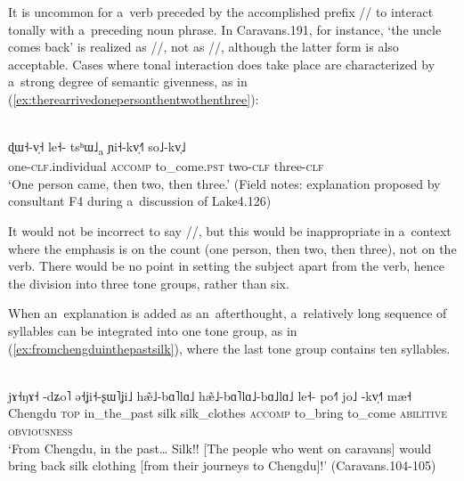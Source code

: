 It is uncommon for a~verb preceded by the {accomplished} prefix // to interact tonally with
a~preceding noun phrase. In Caravans.191, for instance, ‘the uncle comes back’ is realized as
//, not as //, although the latter form is also
acceptable. Cases where tonal interaction does take place are characterized by a~strong degree of
semantic givenness, as in (\ref{ex:therearrivedonepersonthentwothenthree}):
\begin{exe}
  \ex
  \label{ex:therearrivedonepersonthentwothenthree}
  \\
  \gll ɖɯ˧-v̩˧	le˧-	tsʰɯ˩\textsubscript{a}	ɲi˧-kv̩˧˥	so˩-kv̩˩\\
  one-\textsc{clf}.individual	\textsc{accomp}	to\_come.\textsc{pst}	two-\textsc{clf}	three-\textsc{clf}\\
  \glt ‘One person came, then two, then three.’ (Field notes: explanation proposed by
  consultant F4 during a~discussion of Lake4.126)
\end{exe}
 
It would not be incorrect to say //, but this would be inappropriate in a~context where the emphasis is on the count (one person, then two, then three), not on the verb. There would be no point in setting
the subject apart from the verb, hence the division into three tone groups, rather than six.

When an~explanation is added as an~afterthought, a~relatively long sequence of syllables can be
integrated into one tone group, as in (\ref{ex:fromchengduinthepastsilk}), where the last tone
group contains ten syllables.
\begin{exe}
  \ex
  \label{ex:fromchengduinthepastsilk}
  \\
  \gll jɤ˧ŋɤ˧		-dʑo˥	ə˧ʝi˧-ʂɯ˥ʝi˩	hæ̃˩-bɑ˥lɑ˩	hæ̃˩-bɑ˥lɑ˩-bɑ˩lɑ˩  le˧-		po˧˥		jo˩		-kv̩˧˥
  mæ˧\\
  Chengdu	\textsc{top}	in\_the\_past	silk		silk\_clothes \textsc{accomp}	to\_bring	to\_come
  \textsc{abilitive}	\textsc{obviousness}\\
  \glt ‘From Chengdu, in the past{\dots} Silk!! [The people who went on caravans] would bring back
  silk clothing [from their journeys to Chengdu]!’ (Caravans.104-105)
\end{exe}

